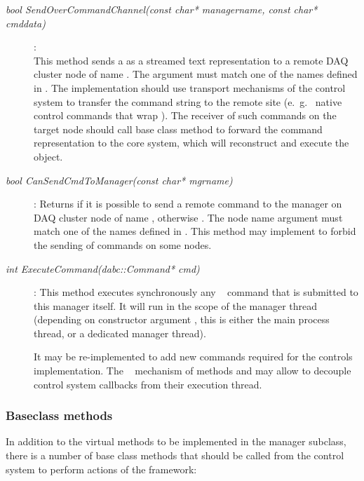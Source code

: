 \begin{description}
\item[\em bool SendOverCommandChannel(const char* managername, const char* cmddata)] :
 \\
This method sends a  as a streamed text representation 
to a remote DAQ cluster node of name .
The  argument must match one of the names defined in
. The implementation should use
transport mechanisms of the control system to transfer the
command string to the remote site 
(e.~g.~ native control commands that wrap ).
The receiver of such commands on the target node
should call base class method
 to 
forward the command representation to the core system,
which will reconstruct and execute the  object. 

 
\item[\em bool CanSendCmdToManager(const char* mgrname)] :
Returns  if it is possible to send a remote
command to the manager on DAQ cluster node of name ,
otherwise . 
The node name argument must match one of the names defined in
.
This method may implement to forbid the sending of commands on some nodes.


\item[\em int ExecuteCommand(dabc::Command* cmd)] :
This method executes synchronously any
\dabc~ command that is submitted to this manager itself.
It will run in the scope of the manager thread
(depending on constructor argument , 
this is either the main process thread, or a dedicated manager thread).

It may be re-implemented to add new commands required for the
controls implementation. The \dabc~ mechanism of
methods  and  may allow
to decouple control system callbacks from their execution thread.

 
\end{description}


\subsubsection{Baseclass methods}
\label{prog_manager_controls_base}
In addition to the virtual methods to be implemented in the manager subclass,
there is a number of  base class methods 
that should be called from the control system to perform actions of the 
framework:

